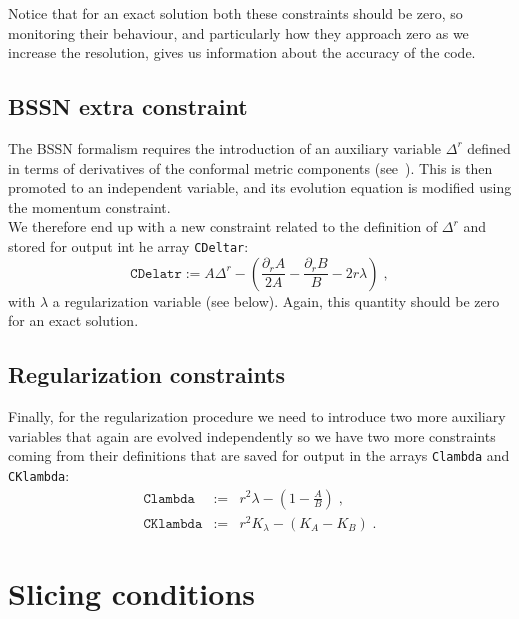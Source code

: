 \documentclass[12pt]{article}
\begin{document}
Notice that for an exact solution both these constraints should be
zero, so monitoring their behaviour, and particularly how they
approach zero as we increase the resolution, gives us information
about the accuracy of the code. \\


\subsection{BSSN extra constraint}

The BSSN formalism requires the introduction of an auxiliary variable
$\Delta^r$ defined in terms of derivatives of the conformal metric
components (see~\cite{Alcubierre11}).  This is then promoted
to an independent variable, and its evolution equation is modified
using the momentum constraint. \\

We therefore end up with a new constraint related to the definition of
$\Delta^r$ and stored for output int he array \texttt{CDeltar}:
\begin{equation}
\texttt{CDelatr} := A \Delta^r - \left( \frac{\partial_r A}{2A} -
\frac{\partial_r B}{B} - 2 r \lambda \right) \; ,
\end{equation}
with $\lambda$ a regularization variable (see below). Again, this
quantity should be zero for an exact solution. \\


\subsection{Regularization constraints}

Finally, for the regularization procedure we need to introduce two
more auxiliary variables that again are evolved independently so we
have two more constraints coming from their definitions that are
saved for output in the arrays \texttt{Clambda} and \texttt{CKlambda}:
\begin{eqnarray}
\texttt{Clambda} &:=& r^2 \lambda - \left( 1 - \frac{A}{B} \right) \; , \\
\texttt{CKlambda} &:=& r^2 K_\lambda - \left( K_A - K_B \right) \; .
\end{eqnarray}

\vspace{3mm}



\setcounter{equation}{0}
\section{Slicing conditions}
\label{sec:slicing}
\end{document}
